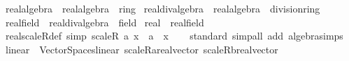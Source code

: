 \begin{isabellebody}
\isanewline
{}\isamarkupfalse%
\ real{\isacharunderscore}{\kern0pt}algebra{\isacharunderscore}{\kern0pt}{}\ {\isacharequal}{\kern0pt}\ real{\isacharunderscore}{\kern0pt}algebra\ {\isacharplus}{\kern0pt}\ ring{\isacharunderscore}{\kern0pt}{}\isanewline
\isanewline
{}\isamarkupfalse%
\ real{\isacharunderscore}{\kern0pt}div{\isacharunderscore}{\kern0pt}algebra\ {\isacharequal}{\kern0pt}\ real{\isacharunderscore}{\kern0pt}algebra{\isacharunderscore}{\kern0pt}{}\ {\isacharplus}{\kern0pt}\ division{\isacharunderscore}{\kern0pt}ring\isanewline
\isanewline
{}\isamarkupfalse%
\ real{\isacharunderscore}{\kern0pt}field\ {\isacharequal}{\kern0pt}\ real{\isacharunderscore}{\kern0pt}div{\isacharunderscore}{\kern0pt}algebra\ {\isacharplus}{\kern0pt}\ field\isanewline
\isanewline
{}\isamarkupfalse%
\ real\ {\isacharcolon}{\kern0pt}{\isacharcolon}{\kern0pt}\ real{\isacharunderscore}{\kern0pt}field\isanewline
{}\isanewline
\isanewline
{}\isamarkupfalse%
\ real{\isacharunderscore}{\kern0pt}scaleR{\isacharunderscore}{\kern0pt}def\ {\isacharbrackleft}{\kern0pt}simp{\isacharbrackright}{\kern0pt}{\isacharcolon}{\kern0pt}\ {\isachardoublequoteopen}scaleR\ a\ x\ {\isacharequal}{\kern0pt}\ a\ {\isacharasterisk}{\kern0pt}\ x{\isachardoublequoteclose}\isanewline
\isanewline
{}\isamarkupfalse%
\isanewline
%
\isadelimproof
\ \ %
\endisadelimproof
%
\isatagproof
{}\isamarkupfalse%
\ standard\ {\isacharparenleft}{\kern0pt}simp{\isacharunderscore}{\kern0pt}all\ add{\isacharcolon}{\kern0pt}\ algebra{\isacharunderscore}{\kern0pt}simps{\isacharparenright}{\kern0pt}%
\endisatagproof
{\isafoldproof}%
%
\isadelimproof
\isanewline
%
\endisadelimproof
\isanewline
{}\isamarkupfalse%
\isanewline
\isanewline
{}\isamarkupfalse%
\ linear\ {\isacharequal}{\kern0pt}\ Vector{\isacharunderscore}{\kern0pt}Spaces{\isachardot}{\kern0pt}linear\ {\isachardoublequoteopen}scaleR{\isacharcolon}{\kern0pt}{\isacharcolon}{\kern0pt}{\isacharunderscore}{\kern0pt}{\isasymRightarrow}{\isacharunderscore}{\kern0pt}{\isasymRightarrow}{\isacharprime}{\kern0pt}a{\isacharcolon}{\kern0pt}{\isacharcolon}{\kern0pt}real{\isacharunderscore}{\kern0pt}vector{\isachardoublequoteclose}\ {\isachardoublequoteopen}scaleR{\isacharcolon}{\kern0pt}{\isacharcolon}{\kern0pt}{\isacharunderscore}{\kern0pt}{\isasymRightarrow}{\isacharunderscore}{\kern0pt}{\isasymRightarrow}{\isacharprime}{\kern0pt}b{\isacharcolon}{\kern0pt}{\isacharcolon}{\kern0pt}real{\isacharunderscore}{\kern0pt}vector{\isachardoublequoteclose}\isanewline

\end{isabellebody}
